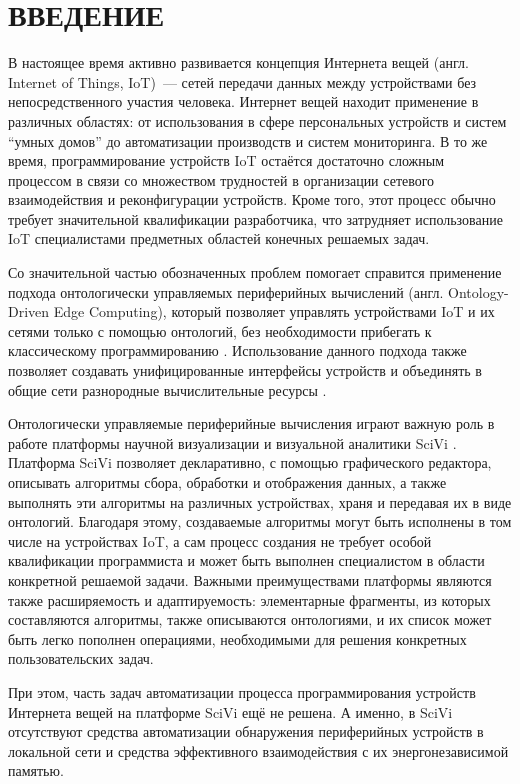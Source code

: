 \chapter*{ВВЕДЕНИЕ}

В настоящее время активно развивается концепция Интернета вещей (англ. Internet of Things, IoT)~--- сетей передачи данных между устройствами без непосредственного участия человека.
Интернет вещей находит применение в различных областях: от использования в сфере персональных устройств и систем "`умных домов"' до автоматизации производств и систем мониторинга.
В то же время, программирование устройств IoT остаётся достаточно сложным процессом в связи со множеством трудностей в организации сетевого взаимодействия и реконфигурации устройств.
Кроме того, этот процесс обычно требует значительной квалификации разработчика, что затрудняет использование IoT специалистами предметных областей конечных решаемых задач.

Со значительной частью обозначенных проблем помогает справится применение подхода онтологически управляемых периферийных вычислений (англ. Ontology-Driven Edge Computing), который позволяет управлять устройствами IoT и их сетями только с помощью онтологий, без необходимости прибегать к классическому программированию \cite{incollection:odec}.
Использование данного подхода также позволяет создавать унифицированные интерфейсы устройств и объединять в общие сети разнородные вычислительные ресурсы \cite{incollection:eon-communications}.

Онтологически управляемые периферийные вычисления играют важную роль в работе платформы научной визуализации и визуальной аналитики SciVi \cite{article:scivi, article:scivi-overview}.
Платформа SciVi позволяет декларативно, с помощью графического редактора, описывать алгоритмы сбора, обработки и отображения данных, а также выполнять эти алгоритмы на различных устройствах, храня и передавая их в виде онтологий.
Благодаря этому, создаваемые алгоритмы могут быть исполнены в том числе на устройствах IoT, а сам процесс создания не требует особой квалификации программиста и может быть выполнен специалистом в области конкретной решаемой задачи.
Важными преимуществами платформы являются также расширяемость и адаптируемость: элементарные фрагменты, из которых составляются алгоритмы, также описываются онтологиями, и их список может быть легко пополнен операциями, необходимыми для решения конкретных пользовательских задач.

При этом, часть задач автоматизации процесса программирования устройств Интернета вещей на платформе SciVi ещё не решена. А именно, в SciVi отсутствуют средства автоматизации обнаружения периферийных устройств в локальной сети и средства эффективного взаимодействия с их энергонезависимой памятью.

